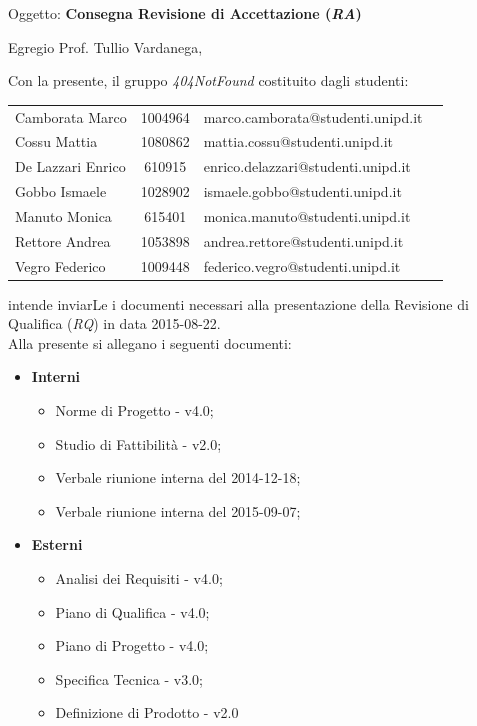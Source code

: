 \documentclass[a4paper,10pt]{letter}
\newcommand{\gruppo}{404NotFound}
\newcommand{\Vardanega}{Prof. Tullio Vardanega}
\newcommand{\VeFe}{Vegro Federico}
\newcommand{\CaMa}{Camborata Marco}
\newcommand{\GoIs}{Gobbo Ismaele}
\newcommand{\DeEn}{De Lazzari Enrico}
\newcommand{\CoMa}{Cossu Mattia}
\newcommand{\ReAn}{Rettore Andrea}
\newcommand{\MaMo}{Manuto Monica}
\begin{document}
	
	\begin{letter}{Oggetto: \textbf{Consegna Revisione di Accettazione (\textit{RA})}}
	\opening {Egregio \Vardanega ,}
	Con la presente, il gruppo \textit{\gruppo} costituito dagli studenti: 
		\begin{center}
		\begin{tabular}{l c l c}					
		\CaMa & 1004964 & marco.camborata@studenti.unipd.it \\
		\CoMa & 1080862 & mattia.cossu@studenti.unipd.it\\
		\DeEn & 610915  & enrico.delazzari@studenti.unipd.it\\ 
		\GoIs & 1028902 & ismaele.gobbo@studenti.unipd.it\\
		\MaMo & 615401  & monica.manuto@studenti.unipd.it\\
		\ReAn & 1053898 & andrea.rettore@studenti.unipd.it\\
		\VeFe & 1009448 & federico.vegro@studenti.unipd.it\\
		\end{tabular}
		\end{center}
	intende inviarLe i documenti necessari alla presentazione della Revisione di Qualifica (\textit{RQ}) in data 2015-08-22.\\
    Alla presente si allegano i seguenti documenti:
			\begin{itemize}
				\item \textbf{Interni}
					\begin{itemize}
						\item Norme di Progetto - v4.0;
						\item Studio di Fattibilità - v2.0;
						\item Verbale riunione interna del 2014-12-18;	
						\item Verbale riunione interna del 2015-09-07;	
					\end{itemize}
				\item \textbf{Esterni}
					\begin{itemize}
						\item Analisi dei Requisiti - v4.0;
						\item Piano di Qualifica - v4.0;
						\item Piano di Progetto - v4.0;
						\item Specifica Tecnica - v3.0;	
						\item Definizione di Prodotto - v2.0

\end{itemize}
\end{itemize}
\end{letter}
\end{document}
